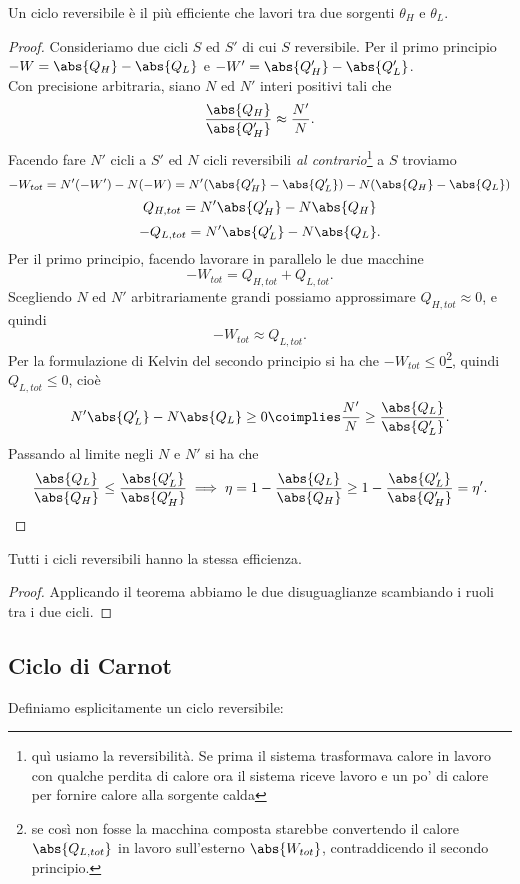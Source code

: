 \begin{theorem}[di Carnot]\label{TeoremaDiCarnot}
Un ciclo reversibile \`e il pi\`u efficiente che lavori tra due sorgenti $\theta_H$ e $\theta_L$.
\end{theorem}
\begin{proof}
Consideriamo due cicli $S$ ed $S'$ di cui $S$ reversibile. Per il primo principio $-W=\abs{Q_H}-\abs{Q_L}$ e $-W'=\abs{Q_H'}-\abs{Q_L'}$.\\
Con precisione arbitraria, siano $N$ ed $N'$ interi positivi tali che
\[\frac{\abs{Q_H}}{\abs{Q_H'}}\approx \frac{N'}{N}.\]
Facendo fare $N'$ cicli a $S'$ ed $N$ cicli reversibili \textit{al contrario}\footnote{qu\`i usiamo la reversibilit\`a. Se prima il sistema trasformava calore in lavoro con qualche perdita di calore ora il sistema riceve lavoro e un po' di calore per fornire calore alla sorgente calda} a $S$ troviamo
\[-W_{tot}=N'(-W')-N(-W)=N'(\abs{Q_H'}-\abs{Q_L'})-N(\abs{Q_H}-\abs{Q_L})\]
\[Q_{H,tot}=N'\abs{Q_H'}-N\abs{Q_H}\]
\[-Q_{L,tot}=N'\abs{Q_L'}-N\abs{Q_L}.\]
Per il primo principio, facendo lavorare in parallelo le due macchine
\[-W_{tot}=Q_{H,tot}+Q_{L,tot}.\]
Scegliendo $N$ ed $N'$ arbitrariamente grandi possiamo approssimare $Q_{H,tot}\approx 0$, e quindi
\[-W_{tot}\approx Q_{L,tot}.\]
Per la formulazione di Kelvin del secondo principio si ha che $-W_{tot}\leq0$\footnote{se cos\`i non fosse la macchina composta starebbe convertendo il calore $\abs{Q_{L,tot}}$ in lavoro sull'esterno $\abs{W_{tot}}$, contraddicendo il secondo principio.}, quindi $Q_{L,tot}\leq 0$, cio\`e
\[N'\abs{Q_L'}-N\abs{Q_L}\geq 0\coimplies \frac{N'}N\geq \frac{\abs{Q_L}}{\abs{Q_L'}}.\]
Passando al limite negli $N$ e $N'$ si ha che
\[\frac{\abs{Q_L}}{\abs{Q_H}}\leq \frac{\abs{Q_L'}}{\abs{Q_H'}}\implies \eta=1-\frac{\abs{Q_L}}{\abs{Q_H}}\geq 1-\frac{\abs{Q_L'}}{\abs{Q_H'}}=\eta'.\]
\end{proof}

\begin{corollary}\label{CicliReversibiliHannoLaStessaEfficienza}
Tutti i cicli reversibili hanno la stessa efficienza.
\end{corollary}
\begin{proof}
Applicando il teorema abbiamo le due disuguaglianze scambiando i ruoli tra i due cicli.
\end{proof}


\subsection{Ciclo di Carnot}
Definiamo esplicitamente un ciclo reversibile:

